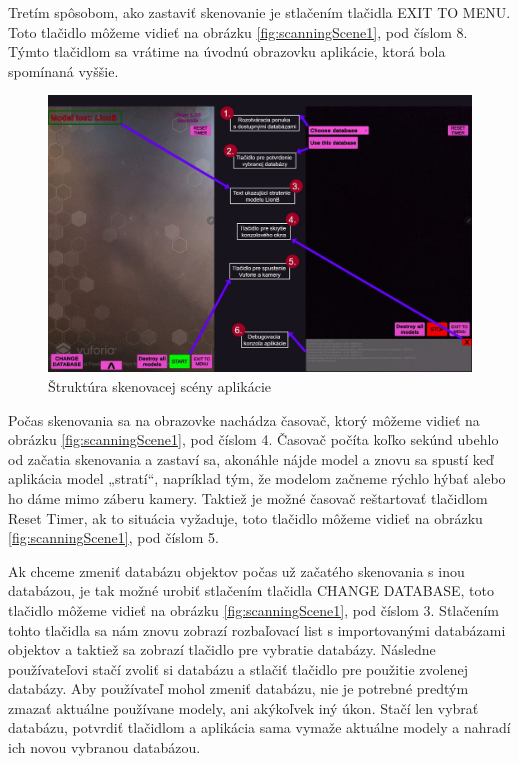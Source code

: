 Tretím spôsobom, ako zastaviť skenovanie je stlačením tlačidla EXIT TO MENU. Toto tlačidlo môžeme vidieť na obrázku \ref{fig:scanningScene1}, pod číslom 8. Týmto tlačidlom sa vrátime na úvodnú obrazovku aplikácie, ktorá bola spomínaná vyššie. 

\begin{figure}[!h]
  \centering
  \includegraphics[width=1\textwidth]{img/Scanning_scene_part2Collapse.jpg}
  \caption{Štruktúra skenovacej scény aplikácie}
  \label{fig:scanningScene2}
\end{figure}

Počas skenovania sa na obrazovke nachádza časovač, ktorý môžeme vidieť na obrázku \ref{fig:scanningScene1}, pod číslom 4. Časovač počíta koľko sekúnd ubehlo od začatia skenovania a zastaví sa, akonáhle nájde model a znovu sa spustí keď aplikácia model „stratí“, napríklad tým, že modelom začneme rýchlo hýbať alebo ho dáme mimo záberu kamery. Taktiež je možné časovač reštartovať tlačidlom Reset Timer, ak to situácia vyžaduje, toto tlačidlo môžeme vidieť na obrázku \ref{fig:scanningScene1}, pod číslom 5. 

Ak chceme zmeniť databázu objektov počas už začatého skenovania s inou databázou, je tak možné urobiť stlačením tlačidla CHANGE DATABASE, toto tlačidlo môžeme vidieť na obrázku \ref{fig:scanningScene1}, pod číslom 3. Stlačením tohto tlačidla sa nám znovu zobrazí rozbaľovací list s importovanými databázami objektov a taktiež sa zobrazí tlačidlo pre vybratie databázy. Následne používateľovi stačí  zvoliť si databázu a stlačiť tlačidlo pre použitie zvolenej databázy. Aby používateľ mohol zmeniť databázu, nie je potrebné predtým zmazať aktuálne používane modely, ani akýkoľvek iný úkon. Stačí len vybrať databázu, potvrdiť tlačidlom a aplikácia sama vymaže aktuálne modely a nahradí ich novou vybranou databázou.


